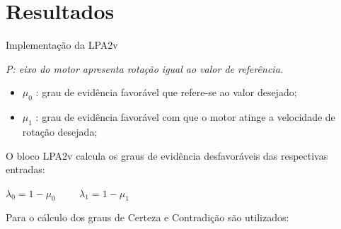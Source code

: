 \section{Resultados}


\begin{frame}{Implementação da LPA2v}

\emph{ P:  eixo do motor apresenta rotação igual ao valor de referência.}

\begin{itemize}
\item $\mu _0$ : grau de evidência favorável que refere-se ao valor desejado;
\item $\mu _1$ : grau de evidência favorável com que o motor atinge a velocidade de rotação desejada;
\end{itemize}
O bloco LPA2v calcula os graus de evidência desfavoráveis das respectivas entradas:

\centering
$\lambda _0 = 1- \mu _0   \hspace{1cm}   \lambda _1 = 1 - \mu_1 $

\vspace{0.5cm}

Para o cálculo dos graus de Certeza e Contradição são utilizados:

\vspace{0.5cm}


\end{frame}









